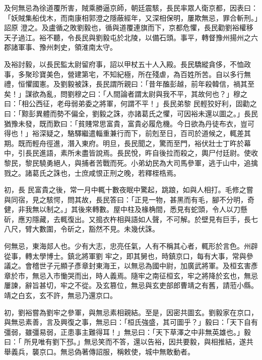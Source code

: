 \begin{pinyinscope}
 及何無忌為徐道覆所害，賊乘勝逼京師，朝廷震駭，長民率眾人衛京都，因表曰：「妖賊集船伐木，而南康相郭澄之隱蔽經年，又深相保明，屢欺無忌，罪合斬刑。」詔原
 澄之。及盧循之敗劉毅也，循與道覆連旗而下，京都危懼，長民勸劉裕權移天子過江。裕不聽，令長民與劉毅屯於北陵，以備石頭。事平，轉督豫州揚州之六郡諸軍事、豫州刺史，領淮南太守。



 及裕討毅，以長民監太尉留府事，詔以甲杖五十人入殿。長民驕縱貪侈，不恤政事，多聚珍寶美色，營建第宅，不知紀極，所在殘虐，為百姓所苦。自以多行無禮，恒懼國憲。及劉毅被誅，長民謂所親曰：「昔年醢彭越，前年殺韓信，禍其至矣！」謀欲為亂，問劉穆之曰：「人間論者謂太尉與我不平，其故何也？」穆之曰：「相公西征，老母弱弟委之將軍，何謂不平！」長民弟黎
 民輕狡好利，固勸之曰：「黥彭異體而勢不偏全，劉毅之誅，亦諸葛氏之懼，可因裕未還以圖之。」長民猶豫未發，既而歎曰：「貧賤常思富貴，富貴必履危機。今日欲為丹徒布衣，豈可得也！」裕深疑之，駱驛繼遣輜重兼行而下，前剋至日，百司於道候之，輒差其期。既而輕舟徑進，潛入東府。明旦，長民聞之，驚而至門，裕伏壯士丁旿於幕中，引長民進語，素所未盡皆說焉。長民悅，旿自後拉而殺之，輿尸付廷尉。使收黎民，黎民驍勇絕人，與捕者苦戰而死。小弟幼民為大司馬參軍，逃于山中，追擒戮之。諸葛氏之誅也，士庶咸恨正刑之晚，若釋桎梏焉。



 初，長
 民富貴之後，常一月中輒十數夜眠中驚起，跳踉，如與人相打。毛修之嘗與同宿，見之駭愕，問其故，長民答曰：「正見一物，甚黑而有毛，腳不分明，奇健，非我無以制之。」其後來轉數。屋中柱及椽桷間，悉見有蛇頭，令人以刀懸斫，應刃隱藏，去輒復出。又搗衣杵相與語如人聲，不可解。於壁見有巨手，長七八尺，臂大數圍，令斫之，豁然不見。未幾伏誅。



 何無忌，東海郯人也。少有大志，忠亮任氣，人有不稱其心者，輒形於言色。州辟從事，轉太學博士。鎮北將軍劉
 牢之，即其舅也，時鎮京口，每有大事，常與參議之。會稽世子元顯子彥章封東海王，以無忌為國中尉，加廣武將軍。及桓玄害彥章於市，無忌入市慟哭而出，時人義焉。隨牢之南征桓玄，牢之將降於玄也，無忌屢諫，辭旨甚切，牢之不從。及玄篡位，無忌與玄吏部郎曹靖之有舊，請蒞小縣。靖之白玄，玄不許，無忌乃還京口。



 初，劉裕嘗為劉牢之參軍，與無忌素相親結。至是，因密共圖玄。劉毅家在京口，與無忌素善，言及興復之事，無忌曰：「桓氏強盛，其可圖乎？」毅曰：「天下自有彊弱，雖彊易弱，正患事主難得耳！」無忌曰：「天下草澤之中非無英雄也。」毅曰：「
 所見唯有劉下邳。」無忌笑而不答，還以告裕，因共要毅，與相推結，遂共舉義兵，襲京口。無忌偽著傳詔服，稱敕使，城中無敢動者。




\end{pinyinscope}
